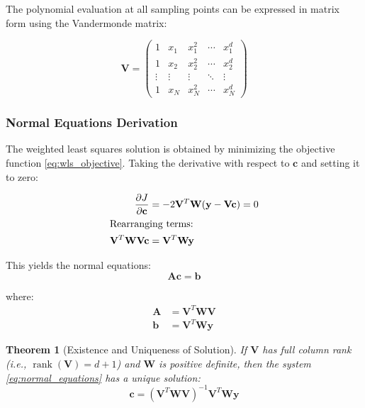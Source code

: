 \documentclass[12pt]{article}
\renewcommand{\vec}[1]{\mathbf{#1}}
\DeclareMathOperator{\rank}{rank}
\newtheorem{theorem}{Theorem}[section]
\begin{document}
The polynomial evaluation at all sampling points can be expressed in matrix form using the Vandermonde matrix:

\begin{equation}
    \mathbf{V} = \begin{pmatrix}
        1      & x_1    & x_1^2  & \cdots & x_1^d  \\
        1      & x_2    & x_2^2  & \cdots & x_2^d  \\
        \vdots & \vdots & \vdots & \ddots & \vdots \\
        1      & x_N    & x_N^2  & \cdots & x_N^d
    \end{pmatrix}
\end{equation}


\subsubsection{Normal Equations Derivation}

The weighted least squares solution is obtained by minimizing the objective function \eqref{eq:wls_objective}. Taking the derivative with respect to $\vec{c}$ and setting it to zero:

\begin{align}
    \frac{\partial J}{\partial \vec{c}}        & = -2\mathbf{V}^T \mathbf{W} (\vec{y} - \mathbf{V}\vec{c}) = 0 \\
    \intertext{Rearranging terms:}
    \mathbf{V}^T \mathbf{W} \mathbf{V} \vec{c} & = \mathbf{V}^T \mathbf{W} \vec{y}
\end{align}

This yields the normal equations:
\begin{equation}
    \label{eq:normal_equations}
    \boxed{\mathbf{A} \vec{c} = \vec{b}}
\end{equation}

where:
\begin{align}
    \mathbf{A} & = \mathbf{V}^T \mathbf{W} \mathbf{V} \\
    \vec{b}    & = \mathbf{V}^T \mathbf{W} \vec{y}
\end{align}

\begin{theorem}[Existence and Uniqueness of Solution]
    \label{thm:existence_uniqueness}
    If $\mathbf{V}$ has full column rank (i.e., $\rank(\mathbf{V}) = d+1$) and $\mathbf{W}$ is positive definite, then the system \eqref{eq:normal_equations} has a unique solution:
    \begin{equation}
        \vec{c} = (\mathbf{V}^T \mathbf{W} \mathbf{V})^{-1} \mathbf{V}^T \mathbf{W} \vec{y}
    \end{equation}
\end{theorem}
\end{document}
